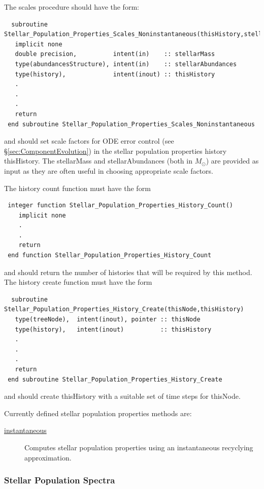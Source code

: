 The scales procedure should have the form:
\begin{verbatim}
  subroutine Stellar_Population_Properties_Scales_Noninstantaneous(thisHistory,stellarMass,stellarAbundances)
   implicit none
   double precision,          intent(in)    :: stellarMass
   type(abundancesStructure), intent(in)    :: stellarAbundances
   type(history),             intent(inout) :: thisHistory
   .
   .
   .
   return
 end subroutine Stellar_Population_Properties_Scales_Noninstantaneous
\end{verbatim}
and should set scale factors for ODE error control (see \S\ref{sec:ComponentEvolution}) in the stellar population properties history {\normalfont \ttfamily thisHistory}. The {\normalfont \ttfamily stellarMass} and {\normalfont \ttfamily stellarAbundances} (both in $M_\odot$) are provided as input as they are often useful in choosing appropriate scale factors.

The history count function must have the form
\begin{verbatim}
 integer function Stellar_Population_Properties_History_Count()
    implicit none
    .
    .
    return
 end function Stellar_Population_Properties_History_Count
\end{verbatim}
and should return the number of histories that will be required by this method. The history create function must have the form
\begin{verbatim}
  subroutine Stellar_Population_Properties_History_Create(thisNode,thisHistory)
   type(treeNode),  intent(inout), pointer :: thisNode
   type(history),   intent(inout)          :: thisHistory
   .
   .
   .
   return
 end subroutine Stellar_Population_Properties_History_Create
\end{verbatim}
and should create {\normalfont \ttfamily thisHistory} with a suitable set of time steps for {\normalfont \ttfamily thisNode}.

Currently defined stellar population properties methods are:
\begin{description}
 \item [\hyperlink{stellar_populations.properties.instantaneous.F90:stellar_population_properties_instantaneous:stellar_population_properties_rates_instantaneous}{{\normalfont \ttfamily instantaneous}}] Computes stellar population properties using an instantaneous recyclying approximation.
\end{description}

\subsubsection{Stellar Population Spectra}\label{sec:StellarPopulationSpectra}

